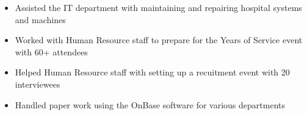 \documentclass[10pt,letter]{altacv}
\begin{document}


\smallskip






\begin{itemize}
  \item Assisted the IT department with maintaining and repairing hospital systems and machines
  \item Worked with Human Resource staff to prepare for the Years of Service event with 60+ attendees
  \item Helped Human Resource staff with setting up a recuitment event with 20 interviewees
  \item Handled paper work using the OnBase software for various departments 
\end{itemize}
\end{document}
